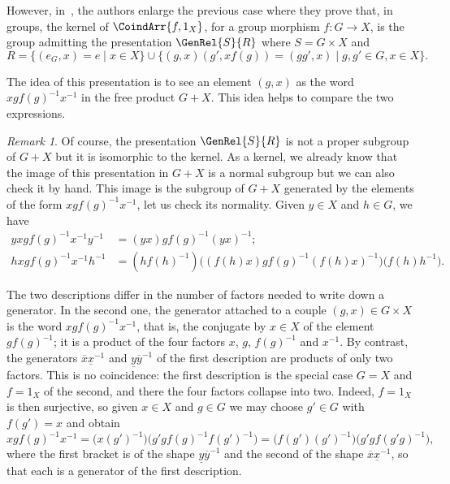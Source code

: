\documentclass[a4paper, british, reqno]{amsart}
\newcommand*{\from}{\colon}
\renewcommand*{\and}{,}
\renewcommand*{\and}{,}
\theoremstyle{definition}
\theoremstyle{remark}
\newtheorem{remark}[theorem]{Remark}
\begin{document}
However, in~\cite{DGMVdL}, the authors enlarge the previous case where they prove that, in groups, the kernel of \(\CoindArr{f\and 1_X}\), for a group morphism \(f\from G\to X\), is the group admitting the presentation \(\GenRel{S}{R}\) where \(S=G\times X\) and
\begin{equation}
	\label{eq: relation for kernel in group}
	R = \{
	(e_G,x) = e \mid x\in X\} \cup \{(g,x)(g',xf(g))=(gg',x)\mid g,g'\in G, x\in X\}
	\text{.}
\end{equation}

The idea of this presentation is to see an element \((g,x)\) as the word \(xgf(g)^{-1}x^{-1}\) in the free product \(G+X\). This idea helps to compare the two expressions.

\begin{remark}
	\label{rem: the kernel described for group is a normal subgroup}
	Of course, the presentation \(\GenRel{S}{R}\) is not a proper subgroup of \(G+X\) but it is isomorphic to the kernel. As a kernel, we already know that the image of this presentation in \(G+X\) is a normal subgroup but we can also check it by hand. This image is the subgroup of \(G+X\) generated by the elements of the form \(xgf(g)^{-1}x^{-1}\), let us check its normality. Given \(y\in X\) and \(h\in G\), we have
	\[
		\begin{split}
			yxgf(g)^{-1}x^{-1}y^{-1} & =(yx)gf(g)^{-1}(yx)^{-1}\text{;}                                                     \\
			hxgf(g)^{-1}x^{-1}h^{-1} & =(hf(h)^{-1})\bigl((f(h)x)gf(g)^{-1}(f(h)x)^{-1}\bigr)\bigl(f(h)h^{-1}\bigr)\text{.}
		\end{split}
	\]
\end{remark}

The two descriptions differ in the number of factors needed to write down a generator. In the second one, the generator attached to a couple \((g,x)\in G\times X\) is the word \(xgf(g)^{-1}x^{-1}\), that is, the conjugate by \(x\in X\) of the element \(gf(g)^{-1}\); it is a product of the four factors \(x\), \(g\), \(f(g)^{-1}\) and \(x^{-1}\). By contrast, the generators \(\overline{x}\underline{x}^{-1}\) and \(\underline{y}\overline{y}^{-1}\) of the first description are products of only two factors. This is no coincidence: the first description is the special case \(G=X\) and \(f=1_X\) of the second, and there the four factors collapse into two. Indeed, \(f=1_X\) is then surjective, so given \(x\in X\) and \(g\in G\) we may choose \(g'\in G\) with \(f(g')=x\) and obtain
\[
	xgf(g)^{-1}x^{-1}=\bigl(x(g')^{-1}\bigr)\bigl(g'gf(g)^{-1}f(g')^{-1}\bigr)= \bigl(f(g')(g')^{-1}\bigr)\bigl(g'gf(g'g)^{-1}\bigr)\text{,}
\]
where the first bracket is of the shape \(\underline{y}\overline{y}^{-1}\) and the second of the shape \(\overline{x}\underline{x}^{-1}\), so that each is a generator of the first description.
\end{document}
